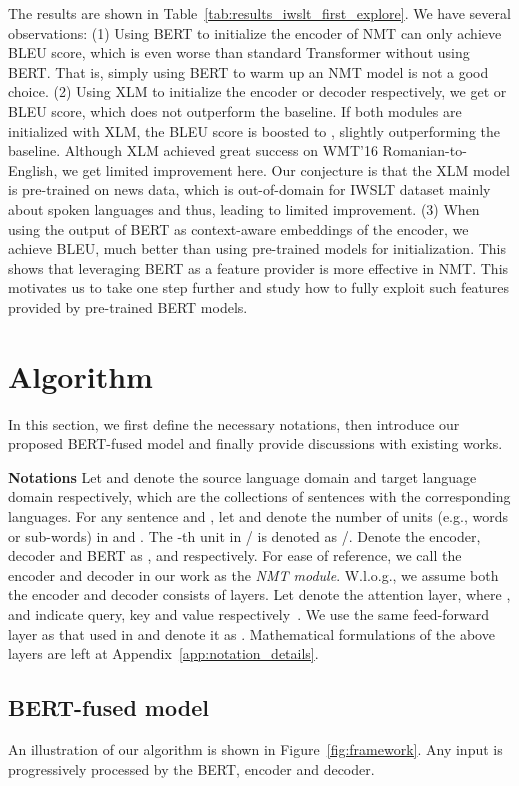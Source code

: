 \documentclass{article} \usepackage{iclr2020_conference,times}
\begin{document}
The results are shown in Table~\ref{tab:results_iwslt_first_explore}. We have several observations: (1) Using BERT to initialize the encoder of NMT can only achieve  BLEU score, which is even worse than standard Transformer without using BERT. That is, simply using BERT to warm up an NMT model is not a good choice. (2) Using XLM to initialize the encoder or decoder respectively, we get  or  BLEU score, which does not outperform the baseline. If both modules are initialized with XLM, the BLEU score is boosted to , slightly outperforming the baseline. Although XLM achieved great success on WMT'16 Romanian-to-English, we get limited improvement here. Our conjecture is that the XLM model is pre-trained on news data, which is out-of-domain for IWSLT dataset mainly about spoken languages and thus, leading to limited improvement. (3) When using the output of BERT as context-aware embeddings of the encoder, we achieve  BLEU, much better than using pre-trained models for initialization.  This shows that leveraging BERT as a feature provider is more effective in NMT. This motivates us to take one step further and study how to fully exploit such features provided by pre-trained BERT models.


\section{Algorithm}\label{sec:framework}
In this section, we first define the necessary notations, then introduce our proposed BERT-fused model and finally provide discussions with existing works. 

\noindent\textbf{Notations} Let  and  denote the source language domain and target language domain respectively, which are the collections of sentences with the corresponding languages. For any sentence  and , let  and  denote the number of units (e.g., words or sub-words) in  and . The -th unit in / is denoted as /. Denote the encoder, decoder and BERT as ,  and  respectively. For ease of reference, we call the encoder and decoder in our work as the {\em NMT module}. W.l.o.g., we assume both the encoder and decoder consists of  layers. Let  denote the attention layer, where ,  and  indicate query, key and value respectively~\citep{vaswani2017attention}. We use the same feed-forward layer as that used in \citep{vaswani2017attention} and denote it as . Mathematical formulations of the above layers are left at Appendix~\ref{app:notation_details}.

\subsection{BERT-fused model}
An illustration of our algorithm is shown in Figure~\ref{fig:framework}. Any input  is progressively processed by the BERT, encoder and decoder.
\end{document}

